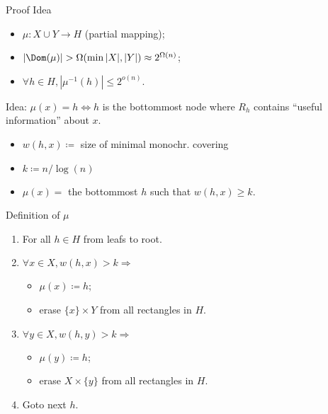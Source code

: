 \begin{frame}{Proof Idea}

    \begin{itemize}
        \item $\mu\colon X \cup Y \to H$ (partial mapping);
        \item $|\Dom(\mu)| > \Omega(\min{|X|, |Y|}) \approx 2^{\Omega(n)}$;
        \item $\forall h \in H, |\mu^{-1}(h)| \le 2^{o(n)}$.
    \end{itemize}

    \pause
    Idea: $\mu(x) = h \Leftrightarrow h$ is the bottommost node where $R_h$ contains ``useful
    information'' about $x$.

    \pause

    \begin{minipage}{0.38\linewidth}
        \centering
        
    \end{minipage}
    \begin{minipage}{0.58\linewidth}
        \pause
        \begin{itemize}
            \item $w(h, x) \coloneqq$ size of minimal monochr. covering
            \item $k \coloneqq n / \log(n)$
            \item $\mu(x) =$ the bottommost $h$ such that $w(h, x) \ge k$.
        \end{itemize}
    \end{minipage}

\end{frame}

\begin{frame}{Definition of $\mu$}

    \begin{enumerate}
        \item For all $h \in H$ from leafs to root.
            \pause
        \item $\forall x \in X, w(h, x) > k \Rightarrow$
            \begin{itemize}
                \item $\mu(x) \coloneqq h$;
                \item erase $\{x\} \times Y$ from \alert{all} rectangles in $H$.
            \end{itemize}
        \item $\forall y \in X, w(h, y) > k \Rightarrow$
            \begin{itemize}
                \item $\mu(y) \coloneqq h$;
                \item erase $X \times \{y\}$ from \alert{all} rectangles in $H$.
            \end{itemize}
        \pause
        \item Goto next $h$.
    \end{enumerate}
\end{frame}


